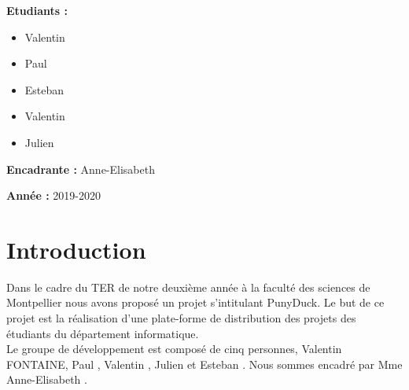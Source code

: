 \documentclass{report}
\begin{document}
\begin{titlepage}
\begin{minipage}[t]{8.5cm}
	\begin{flushleft}
	    \large{\textbf{Etudiants :}}
	    \begin{itemize}
	        \item \large{Valentin }
	        \item \large{Paul  } 
	        \item \large{Esteban }
	        \item \large{Valentin }
	        \item \large{Julien }
	    \end{itemize}
		\vspace{0.5cm}
		\large{\textbf{Encadrante :}}
		\large{Anne-Elisabeth } \\
	\end{flushleft}
\end{minipage}
\hfill
\begin{minipage}[t]{8cm}
	\begin{flushright} 
		\large{\textbf{Année :}} 
		\large{2019-2020}
	\end{flushright}
\end{minipage}
\end{titlepage}

\begin{titlepage}
\renewcommand{\contentsname}{Sommaire}
\setcounter{tocdepth}{1}
\large{\tableofcontents}
\thispagestyle{empty}
\end{titlepage}

\renewcommand{\chaptername}{Partie}



\chapter*{Introduction} %
Dans le cadre du TER de notre deuxième année à la faculté des sciences de Montpellier nous avons proposé un projet s'intitulant PunyDuck. Le but de ce projet est la réalisation d'une plate-forme de distribution des projets des étudiants du département informatique.\\

Le groupe de développement est composé de cinq personnes, Valentin \textsc{FONTAINE}, Paul , Valentin , Julien  et Esteban . Nous sommes encadré par Mme Anne-Elisabeth .
\end{document}
